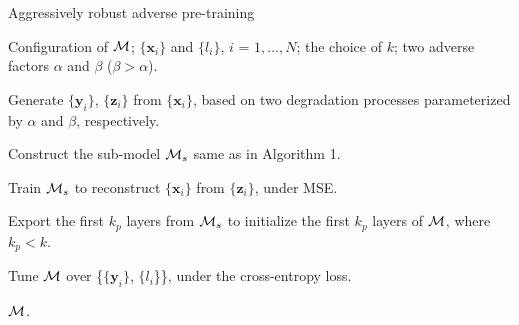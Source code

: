 \documentclass[10pt,twocolumn,twoside]{IEEEtran} %
\begin{document}
	\caption{Aggressively robust adverse pre-training}
	\label{dpretrain}
	\begin{algorithmic}[1]
		\REQUIRE Configuration of ${\mathcal{M}}$; $\{\mathbf{x}_i\}$ and $\{l_i\}$, $i$ = $1, ..., N$; the choice of $k$; two adverse factors $\alpha$ and $\beta$ ($\beta > \alpha$).
		
		\STATE Generate $\{\mathbf{y}_i\}$, $\{\mathbf{z}_i\}$ from $\{\mathbf{x}_i\}$, based on two degradation processes parameterized by $\alpha$ and $\beta$, respectively.
		
		\STATE Construct the sub-model ${\mathcal{M}}_s$ same as in Algorithm 1.
		
		\STATE Train ${\mathcal{M}}_s$ to reconstruct $\{\mathbf{x}_i\}$ from $\{\mathbf{z}_i\}$, under MSE.
		
		\STATE Export the first $k_p$ layers from ${\mathcal{M}}_s$ to initialize the first $k_p$ layers of ${\mathcal{M}}$, where $k_p < k$.
		
		\STATE Tune ${\mathcal{M}}$ over \{$\{\mathbf{y}_i\}$, $\{l_i$\}\}, under the cross-entropy loss.
		
		\ENSURE ${\mathcal{M}}$.
	\end{algorithmic}
\end{document}
